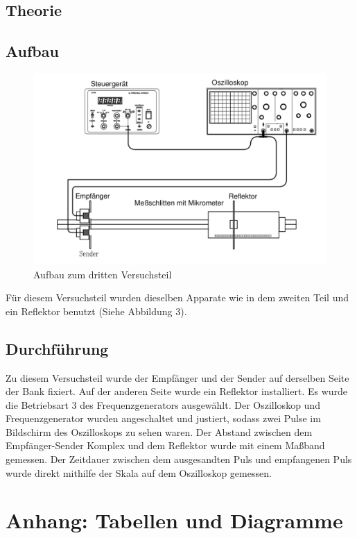 \documentclass[11pt,a4paper]{article}
\begin{document}
\subsection{Theorie}
\subsection{Aufbau}
\begin{figure}
	\centering
	\includegraphics[scale=0.5]{Abb3}
	\caption{Aufbau zum dritten Versuchsteil}
\end{figure}
Für diesem Versuchsteil wurden dieselben Apparate wie in dem zweiten Teil und ein Reflektor benutzt (Siehe Abbildung 3). 

\subsection{Durchführung}
Zu diesem Versuchsteil wurde der Empfänger und der Sender auf derselben Seite der Bank fixiert. Auf der anderen Seite wurde ein Reflektor installiert. Es wurde die Betriebsart 3 des Frequenzgenerators ausgewählt. Der Oszilloskop und Frequenzgenerator wurden angeschaltet und justiert, sodass zwei Pulse im Bildschirm des Oszilloskops zu sehen waren. Der Abstand zwischen dem Empfänger-Sender Komplex und dem Reflektor wurde mit einem Maßband gemessen. Der Zeitdauer zwischen dem ausgesandten Puls und empfangenen Puls wurde direkt mithilfe der Skala auf dem Oszilloskop gemessen. 

\section{Anhang: Tabellen und Diagramme}
\end{document}
